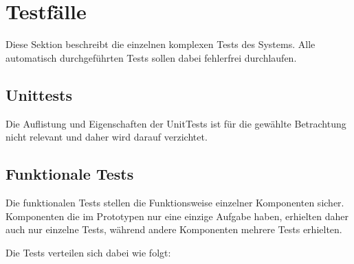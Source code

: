 \section{Testfälle}
\label{sec:eval:testcases}

Diese Sektion beschreibt die einzelnen komplexen Tests des Systems.
Alle automatisch durchgeführten Tests sollen dabei fehlerfrei durchlaufen.

\subsection{Unittests}

Die Auflistung und Eigenschaften der UnitTests
ist für die gewählte Betrachtung nicht relevant und
daher wird darauf verzichtet.

\subsection{Funktionale Tests}
Die funktionalen Tests stellen die Funktionsweise einzelner Komponenten sicher.
Komponenten die im Prototypen nur eine einzige Aufgabe haben,
erhielten daher auch nur einzelne Tests, während andere Komponenten mehrere Tests erhielten.

Die Tests verteilen sich dabei wie folgt:

